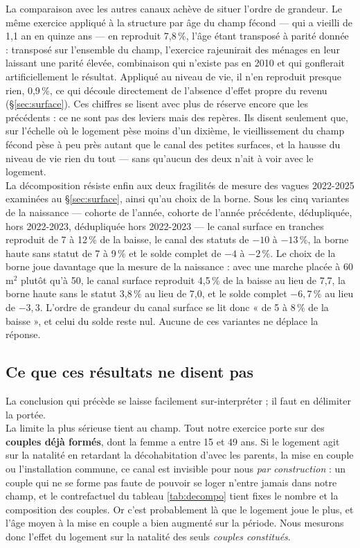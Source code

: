 \documentclass[12pt,a4paper]{article}
\begin{document}
\noindent La comparaison avec les autres canaux achève de situer l'ordre de grandeur. Le même exercice appliqué à la structure par âge du champ fécond — qui a vieilli de 1,1 an en quinze ans — en reproduit 7,8\,\%, l'âge étant transposé à parité donnée : transposé sur l'ensemble du champ, l'exercice rajeunirait des ménages en leur laissant une parité élevée, combinaison qui n'existe pas en 2010 et qui gonflerait artificiellement le résultat. Appliqué au niveau de vie, il n'en reproduit presque rien, 0,9\,\%, ce qui découle directement de l'absence d'effet propre du revenu (§\ref{sec:surface}). Ces chiffres se lisent avec plus de réserve encore que les précédents : ce ne sont pas des leviers mais des repères. Ils disent seulement que, sur l'échelle où le logement pèse moins d'un dixième, le vieillissement du champ fécond pèse à peu près autant que le canal des petites surfaces, et la hausse du niveau de vie rien du tout — sans qu'aucun des deux n'ait à voir avec le logement. \\

\noindent La décomposition résiste enfin aux deux fragilités de mesure des vagues 2022-2025 examinées au §\ref{sec:surface}, ainsi qu'au choix de la borne. Sous les cinq variantes de la naissance — cohorte de l'année, cohorte de l'année précédente, dédupliquée, hors 2022-2023, dédupliquée hors 2022-2023 — le canal surface en tranches reproduit de 7 à 12\,\% de la baisse, le canal des statuts de $-10$ à $-13$\,\%, la borne haute sans statut de 7 à 9\,\% et le solde complet de $-4$ à $-2$\,\%. Le choix de la borne joue davantage que la mesure de la naissance : avec une marche placée à 60 m$^2$ plutôt qu'à 50, le canal surface reproduit 4,5\,\% de la baisse au lieu de 7,7, la borne haute sans le statut 3,8\,\% au lieu de 7,0, et le solde complet $-6{,}7$\,\% au lieu de $-3{,}3$. L'ordre de grandeur du canal surface se lit donc « de 5 à 8\,\% de la baisse », et celui du solde reste nul. Aucune de ces variantes ne déplace la réponse.

\subsection{Ce que ces résultats ne disent pas}

La conclusion qui précède se laisse facilement sur-interpréter ; il faut en délimiter la portée. \\

\noindent La limite la plus sérieuse tient au champ. Tout notre exercice porte sur des \textbf{couples déjà formés}, dont la femme a entre 15 et 49 ans. Si le logement agit sur la natalité en retardant la décohabitation d'avec les parents, la mise en couple ou l'installation commune, ce canal est invisible pour nous \textit{par construction} : un couple qui ne se forme pas faute de pouvoir se loger n'entre jamais dans notre champ, et le contrefactuel du tableau \ref{tab:decompo} tient fixes le nombre et la composition des couples. Or c'est probablement là que le logement joue le plus, et l'âge moyen à la mise en couple a bien augmenté sur la période. Nous mesurons donc l'effet du logement sur la natalité des seuls \textit{couples constitués}. \\
\end{document}
